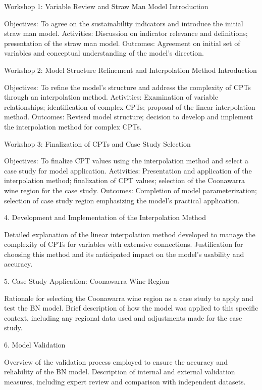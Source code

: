 Workshop 1: Variable Review and Straw Man Model Introduction

    Objectives: To agree on the sustainability indicators and introduce the initial straw man model.
    Activities: Discussion on indicator relevance and definitions; presentation of the straw man model.
    Outcomes: Agreement on initial set of variables and conceptual understanding of the model's direction.

Workshop 2: Model Structure Refinement and Interpolation Method Introduction

    Objectives: To refine the model's structure and address the complexity of CPTs through an interpolation method.
    Activities: Examination of variable relationships; identification of complex CPTs; proposal of the linear interpolation method.
    Outcomes: Revised model structure; decision to develop and implement the interpolation method for complex CPTs.

Workshop 3: Finalization of CPTs and Case Study Selection

    Objectives: To finalize CPT values using the interpolation method and select a case study for model application.
    Activities: Presentation and application of the interpolation method; finalization of CPT values; selection of the Coonawarra wine region for the case study.
    Outcomes: Completion of model parameterization; selection of case study region emphasizing the model's practical application.

4. Development and Implementation of the Interpolation Method

    Detailed explanation of the linear interpolation method developed to manage the complexity of CPTs for variables with extensive connections.
    Justification for choosing this method and its anticipated impact on the model's usability and accuracy.

5. Case Study Application: Coonawarra Wine Region

    Rationale for selecting the Coonawarra wine region as a case study to apply and test the BN model.
    Brief description of how the model was applied to this specific context, including any regional data used and adjustments made for the case study.

6. Model Validation

    Overview of the validation process employed to ensure the accuracy and reliability of the BN model.
    Description of internal and external validation measures, including expert review and comparison with independent datasets.

